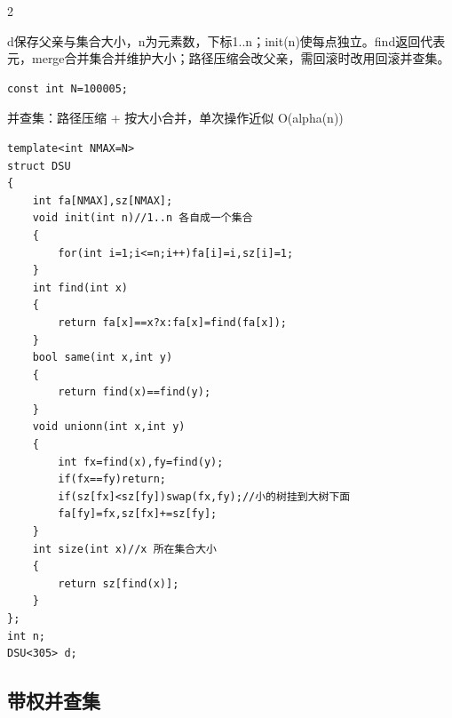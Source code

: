 \documentclass[UTF8,fontset=fandol,a4paper,twoside]{ctexart}
\newcommand{\note}[1]{{\fontsize{10}{12}\selectfont #1\par}}
\begin{document}
\begin{multicols}{2}
\note{d保存父亲与集合大小，n为元素数，下标1.\allowbreak{}.\allowbreak{}n；init(\allowbreak{}n)\allowbreak{}使每点独立。find返回代表元，merge合并集合并维护大小；路径压缩会改父亲，需回滚时改用回滚并查集。}
\begin{lstlisting}
const int N=100005;
\end{lstlisting}
\note{并查集：路径压缩 +\allowbreak{} 按大小合并，单次操作近似 O(\allowbreak{}alpha(\allowbreak{}n)\allowbreak{})\allowbreak{}}
\begin{lstlisting}
template<int NMAX=N>
struct DSU
{
    int fa[NMAX],sz[NMAX];
    void init(int n)//1..n 各自成一个集合
    {
        for(int i=1;i<=n;i++)fa[i]=i,sz[i]=1;
    }
    int find(int x)
    {
        return fa[x]==x?x:fa[x]=find(fa[x]);
    }
    bool same(int x,int y)
    {
        return find(x)==find(y);
    }
    void unionn(int x,int y)
    {
        int fx=find(x),fy=find(y);
        if(fx==fy)return;
        if(sz[fx]<sz[fy])swap(fx,fy);//小的树挂到大树下面
        fa[fy]=fx,sz[fx]+=sz[fy];
    }
    int size(int x)//x 所在集合大小
    {
        return sz[find(x)];
    }
};
int n;
DSU<305> d;
\end{lstlisting}
\subsection{带权并查集}


\end{multicols}
\end{document}
